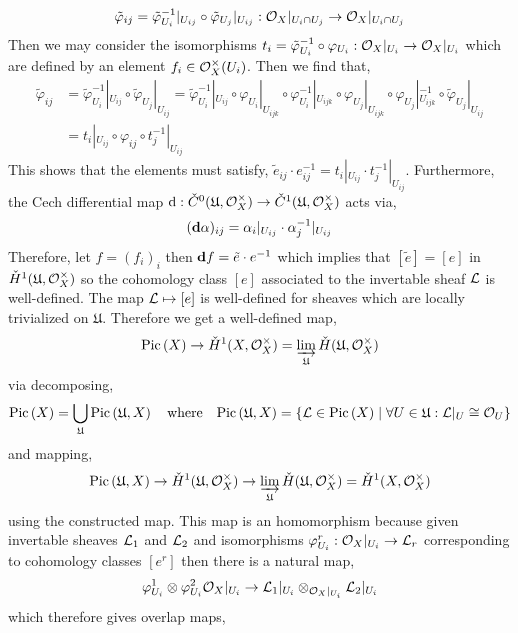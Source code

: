 \documentclass[12pt]{article}
\begin{document}
\[ \tilde{\varphi}_{ij} = \tilde{\varphi}_{U_i}^{-1} |_{U_{ij}} \circ \tilde{\varphi}_{U_j} |_{U_{ij}} : \mathcal{O}_{X} |_{U_i \cap U_j} \to \mathcal{O}_{X} |_{U_i \cap U_j} \]
Then we may consider the isomorphisms $t_i = \tilde{\varphi}_{U_i}^{-1} \circ \varphi_{U_i} : \mathcal{O}_{X} |_{U_i} \to \mathcal{O}_{X} |_{U_i}$ which are defined by an element $f_i \in \mathcal{O}_{X}^\times(U_i)$. Then we find that,
\begin{align*}
\tilde{\varphi}_{ij} & = \tilde{\varphi}_{U_i}^{-1} |_{U_{ij}} \circ \tilde{\varphi}_{U_j} |_{U_{ij}} = \tilde{\varphi}_{U_i}^{-1} |_{U_{ij}} \circ \varphi_{U_i} |_{U_{ijk}} \circ \varphi_{U_i}^{-1} |_{U_{ijk}} \circ \varphi_{U_j} |_{U_{ijk}} \circ  \varphi_{U_j} |_{U_{ijk}}^{-1} \circ \tilde{\varphi}_{U_j} |_{U_{ij}} 
\\
& = t_i |_{U_{ij}} \circ \varphi_{ij} \circ t_j^{-1} |_{U_{ij}}
\end{align*}
This shows that the elements must satisfy, $\tilde{e}_{ij} \cdot e_{ij}^{-1} = t_i |_{U_{ij}} \cdot t_j^{-1} |_{U_{ij}}$. Furthermore, the Cech differential map $\mathrm{d} : \check{C}^0(\mathfrak{U}, \mathcal{O}_{X}^\times) \to \check{C}^1(\mathfrak{U}, \mathcal{O}_{X}^\times)$ acts via,
\[ (\mathbf{d}{\alpha})_{ij} = \alpha_{i} |_{U_{ij}} \cdot \alpha_{j}^{-1} |_{U_{ij}}  \]
Therefore, let $f = (f_i)_i$ then $\mathbf{d}{f} = \tilde{e} \cdot e^{-1}$ which implies that $[\tilde{e}] = [e]$ in $\check{H}^1(\mathfrak{U}, \mathcal{O}_{X}^\times)$ so the cohomology class $[e]$ associated to the invertable sheaf $\mathcal{L}$ is well-defined. The map $\mathcal{L} \mapsto [e]$ is well-defined for sheaves which are locally trivialized on $\mathfrak{U}$. Therefore we get a well-defined map,
\[ \mathrm{Pic} \left( X \right) \to \check{H}^1(X, \mathcal{O}_{X}^\times) = \varinjlim_{\mathfrak{U}} \check{H}(\mathfrak{U}, \mathcal{O}_{X}^\times) \]
via decomposing,
\[ \mathrm{Pic} \left( X \right) = \bigcup_{\mathfrak{U}} \mathrm{Pic} \left( \mathfrak{U}, X \right) \quad \text{where} \quad \mathrm{Pic} \left( \mathfrak{U}, X \right) = \{ \mathcal{L} \in \mathrm{Pic} \left( X \right) \mid \forall U \in \mathfrak{U} : \mathcal{L}|_U \cong \mathcal{O}_{U} \} \]
and mapping,
\[ \mathrm{Pic} \left( \mathfrak{U}, X \right) \to \check{H}^1(\mathfrak{U}, \mathcal{O}_{X}^\times) \to \varinjlim_{\mathfrak{U}} \check{H}(\mathfrak{U}, \mathcal{O}_{X}^\times) = \check{H}^1(X, \mathcal{O}_{X}^\times) \]
using the constructed map. This map is an homomorphism because given invertable sheaves $\mathcal{L}_1$ and $\mathcal{L}_2$ and isomorphisms $\varphi^r_{U_i} : \mathcal{O}_{X} |_{U_i} \to \mathcal{L}_r$ corresponding to cohomology classes $[e^r]$ then there is a natural map,
\[ \varphi^1_{U_i} \otimes \varphi^2_{U_i} \mathcal{O}_{X}|_{U_i} \to \mathcal{L}_1 |_{U_i} \otimes_{\mathcal{O}_{X} |_{U_i}} \mathcal{L}_2 |_{U_i} \]
which therefore gives overlap maps,
\end{document}
